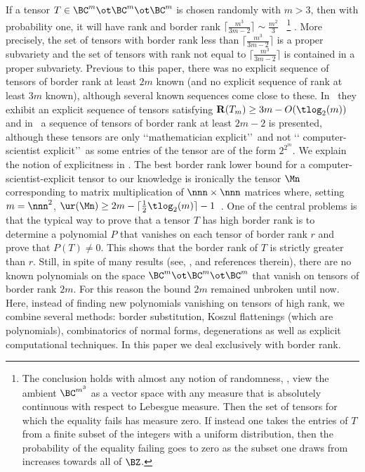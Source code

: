 \documentclass{toc}
\begin{document}
If a tensor  $T\in \BC^m\ot \BC^m\ot \BC^m$ is chosen randomly with $m>3$, then with probability
one, it will have  rank and border rank $\lceil \frac{m^3}{3m-2}\rceil\sim \frac{m^2}3$~\cite{MR87f:15017} 
\footnote{The conclusion holds with almost any notion of %
randomness,  %
\eg, view the ambient $\BC^{m^3}$ as a vector space
with any measure that is absolutely continuous with respect to Lebesgue measure. Then the set of tensors for which the equality fails has measure zero.
If instead one takes the entries of $T$ from a finite subset of the integers with a uniform distribution, then the probability of
the equality failing goes to zero as the subset one draws from increases towards all of $\BZ$.}
.
 More precisely, the
set  of tensors with    border rank less than $\lceil \frac{m^3}{3m-2}\rceil$ is a proper subvariety and the
set of tensors with rank  not equal to  $\lceil \frac{m^3}{3m-2}\rceil$ is contained in a proper subvariety. 
Previous to this paper, there was no explicit sequence of tensors of
 border rank at least $2m$ known (and no explicit
sequence of
rank at least $3m$ known), although several known sequences come close to these.
In~\cite{MR3025382} they exhibit an explicit sequence of tensors satisfying
$\mathbf R(T_m)\geq 3m-O(\tlog_2(m))$
and in~\cite{MR3320240} a sequence of tensors of border rank at least $2m-2$ is presented,
although these tensors are only \lq\lq mathematician explicit\rq\rq\ and not
\lq\lq %
computer-scientist  %
explicit\rq\rq\ 
as some entries of the tensor are of the form $2^{2^m}$. We explain  the notion of
%
explicitness %
%
in .  %
The best border rank lower bound for
a %
%
computer-scientist-explicit  %
tensor to our knowledge is ironically the tensor $\Mn$ corresponding 
to matrix multiplication of $\nnn\times \nnn$
matrices where, setting $m=\nnn^2$,  $\ur(\Mn)\geq 2m-\lceil\frac 12 \tlog_2(m)\rceil-1$~\cite{MR3842382}. One of the central problems is that the typical way to prove that a tensor $T$ has high border rank is to determine a polynomial $P$ that vanishes on each tensor of border rank $r$ and prove that $P(T)\neq 0$. This shows that the border rank of $T$ is strictly greater than $r$. Still, in spite of many results  (see, \eg,  \cite{GO60survey} and references therein), there are no known polynomials on the space $\BC^m\ot \BC^m\ot \BC^m$ that vanish on tensors of border rank $2m$. For this reason the bound $2m$ remained unbroken until now. Here, instead of finding new polynomials vanishing on tensors of high rank, we combine several  methods: border substitution, Koszul flattenings
(which are polynomials),  combinatorics of normal forms, degenerations as well as explicit computational techniques. In this paper
we deal exclusively with border rank.
\end{document}
